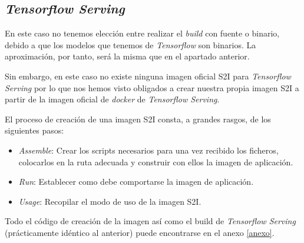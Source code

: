 \subsection{\textit{Tensorflow Serving}}

En este caso no tenemos elección entre realizar el \textit{build} con fuente o binario, debido a que los modelos que tenemos de \textit{Tensorflow} son binarios. La aproximación, por tanto, será la misma que en el apartado anterior. 

Sin embargo, en este caso no existe ninguna imagen oficial S2I para \textit{Tensorflow Serving} por lo que nos hemos visto obligados a crear nuestra propia imagen S2I a partir de la imagen oficial de \textit{docker} de \textit{Tensorflow Serving}.

El proceso de creación de una imagen S2I consta, a grandes rasgos, de los siguientes pasos: 

\begin{itemize}
\item \textit{Assemble}: Crear los scripts necesarios para una vez recibido los ficheros, colocarlos en la ruta adecuada y construir con ellos la imagen de aplicación. 
\item \textit{Run}: Establecer como debe comportarse la imagen de aplicación.
\item \textit{Usage}: Recopilar el modo de uso de la imagen S2I. 

\end{itemize}

Todo el código de creación de la imagen así como el build de \textit{Tensorflow Serving} (prácticamente idéntico al anterior) puede encontrarse en el anexo \ref{anexo}.



